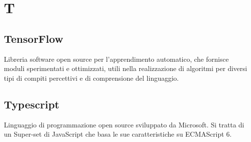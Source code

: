 \section*{T}
\markright{}
\subsection*{TensorFlow}
Libreria software open source per l'apprendimento automatico, che fornisce moduli sperimentati e ottimizzati, utili nella realizzazione di algoritmi per diversi tipi di compiti percettivi e di comprensione del linguaggio.
\subsection*{Typescript}
Linguaggio di programmazione open source sviluppato da Microsoft. Si tratta di un Super-set di JavaScript che basa le sue caratteristiche su ECMAScript 6.